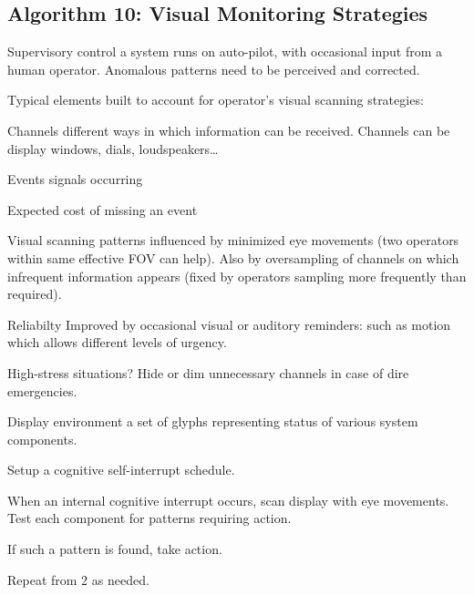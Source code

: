 \begin{mdframed}
\begin{multicols}{2}
\subsection{Algorithm 10: Visual Monitoring Strategies}
\begin{compactdesc}
\item[Supervisory control] a system runs on auto-pilot, with occasional input
    from a human operator. Anomalous patterns need to be perceived and
    corrected.
\item[Typical elements] built to account for operator's visual scanning
    strategies:
    \begin{compactdesc}
    \item[Channels] different ways in which information can be received.
        Channels can be display windows, dials, loudspeakers\dots
    \item[Events] signals occurring
    \item[Expected cost] of missing an event
    \end{compactdesc}
\item[Visual scanning patterns influenced] by minimized eye movements (two
    operators within same effective FOV can help). Also by oversampling of
    channels on which infrequent information appears (fixed by
    operators sampling more frequently than required).
\item[Reliabilty Improved by] occasional visual or auditory reminders: such
    as motion which allows different levels of urgency.
\item[High-stress] situations? Hide or dim unnecessary channels in case of dire
    emergencies.
\item[Display environment] a set of glyphs representing status of various
    system components.
\end{compactdesc}

\midrule\begin{compactenum}
\item Setup a cognitive self-interrupt schedule.
\item When an internal cognitive interrupt occurs, scan display with eye
    movements.
    Test each component for patterns requiring action.
\item If such a pattern is found, take action.
\item Repeat from 2 as needed.
\end{compactenum}

\end{multicols}\end{mdframed}





